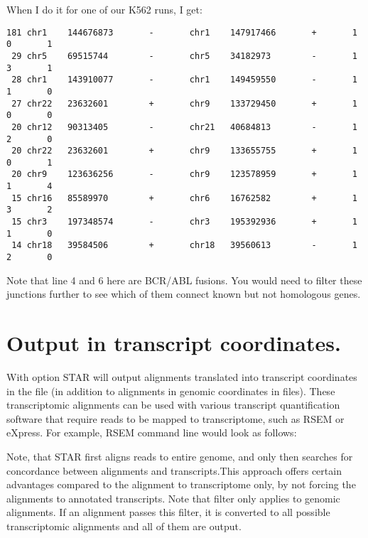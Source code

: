 \documentclass[12pt]{article}
\begin{document}
When I do it for one of our K562 runs, I get:
\begin{verbatim}
181 chr1    144676873       -       chr1    147917466       +       1       0       1
 29 chr5    69515744        -       chr5    34182973        -       1       3       1
 28 chr1    143910077       -       chr1    149459550       -       1       1       0
 27 chr22   23632601        +       chr9    133729450       +       1       0       0
 20 chr12   90313405        -       chr21   40684813        -       1       2       0
 20 chr22   23632601        +       chr9    133655755       +       1       0       1
 20 chr9    123636256       -       chr9    123578959       +       1       1       4
 15 chr16   85589970        +       chr6    16762582        +       1       3       2
 15 chr3    197348574       -       chr3    195392936       +       1       1       0
 14 chr18   39584506        +       chr18   39560613        -       1       2       0
\end{verbatim}
Note that line 4 and 6 here are BCR/ABL fusions. You would need to filter these junctions further to see which of them connect known but not homologous genes. 


\section{Output in transcript coordinates.}
With   option STAR will output alignments translated into transcript coordinates in the  file (in addition to alignments in genomic coordinates in  files). These transcriptomic alignments can be used with various transcript quantification software that require reads to be mapped to transcriptome, such as RSEM or eXpress. For example, RSEM command line would look as follows: 

Note, that STAR first aligns reads to entire genome, and only then searches for concordance between alignments and transcripts.This approach offers certain advantages compared to the alignment to transcriptome only, by not forcing the alignments to annotated transcripts. Note that  filter only applies to genomic alignments. If an alignment passes this filter, it is converted to all possible transcriptomic alignments and all of them are output.
\end{document}

